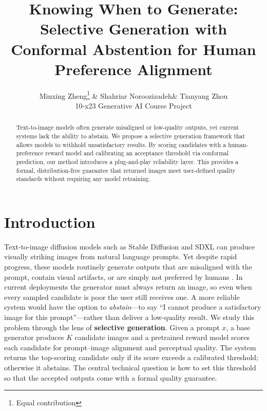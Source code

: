 \documentclass[twocolumn,11pt]{article}
\theoremstyle{plain}
\theoremstyle{definition}
\theoremstyle{remark}
\begin{document}
\title{Knowing When to Generate: Selective Generation with \\Conformal Abstention for Human Preference Alignment}
\author{Minxing Zheng\thanks{Equal contribution} \& Shahriar Noroozizadeh\footnotemark[1] \& Tianyang Zhou\footnotemark[1]\\
10-x23 Generative AI Course Project}
\date{}
\maketitle

\linenumbers

\begin{abstract}
Text-to-image models often generate misaligned or low-quality outputs, yet current systems lack the ability to abstain. We propose a selective generation framework that allows models to withhold unsatisfactory results. By scoring candidates with a human-preference reward model and calibrating an acceptance threshold via conformal prediction, our method introduces a plug-and-play reliability layer. This provides a formal, distribution-free guarantee that returned images meet user-defined quality standards without requiring any model retraining.
\end{abstract}


\section{Introduction}

Text-to-image diffusion models such as Stable Diffusion \citep{rombach2022high} and SDXL \citep{podell2023sdxl} can produce visually striking images from natural language prompts. Yet despite rapid progress, these models routinely generate outputs that are misaligned with the prompt, contain visual artifacts, or are simply not preferred by humans \citep{xu2023imagereward, kirstain2023pick}. In current deployments the generator must always return an image, so even when every sampled candidate is poor the user still receives one. A more reliable system would have the option to \emph{abstain}---to say ``I cannot produce a satisfactory image for this prompt''---rather than deliver a low-quality result.
We study this problem through the lens of \textbf{selective generation}. Given a prompt $x$, a base generator produces $K$ candidate images and a pretrained reward model scores each candidate for prompt--image alignment and perceptual quality. The system returns the top-scoring candidate only if its score exceeds a calibrated threshold; otherwise it abstains. The central technical question is how to set this threshold so that the accepted outputs come with a formal quality guarantee.
\end{document}
